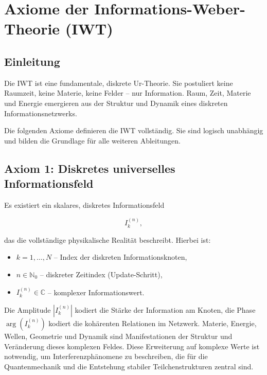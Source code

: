 
\chapter{Axiome der Informations-Weber-Theorie (IWT)}
\label{ch:axiome_iwt}

\section{Einleitung}
\label{sec:axiome_einleitung}

Die IWT ist eine fundamentale, diskrete Ur-Theorie. Sie postuliert keine Raumzeit, keine Materie, keine Felder – nur Information. Raum, Zeit, Materie und Energie emergieren aus der Struktur und Dynamik eines diskreten Informationsnetzwerks.

Die folgenden Axiome definieren die IWT vollständig. Sie sind logisch unabhängig und bilden die Grundlage für alle weiteren Ableitungen.

\section{Axiom 1: Diskretes universelles Informationsfeld}
\label{sec:axiom1}

Es existiert ein skalares, diskretes Informationsfeld

\[
I_k^{(n)},
\]

das die vollständige physikalische Realität beschreibt. Hierbei ist:

\begin{itemize}
    \item \( k = 1, \dots, N \) – Index der diskreten Informationsknoten,
    \item \( n \in \mathbb{N}_0 \) – diskreter Zeitindex (Update-Schritt),
    \item \( I_k^{(n)} \in \mathbb{C} \) – komplexer Informationswert.
\end{itemize}

Die Amplitude \(|I_k^{(n)}|\) kodiert die Stärke der Information am Knoten, die Phase \(\arg(I_k^{(n)})\) kodiert die kohärenten Relationen im Netzwerk. Materie, Energie, Wellen, Geometrie und Dynamik sind Manifestationen der Struktur und Veränderung dieses komplexen Feldes. Diese Erweiterung auf komplexe Werte ist notwendig, um Interferenzphänomene zu beschreiben, die für die Quantenmechanik und die Entstehung stabiler Teilchenstrukturen zentral sind.

